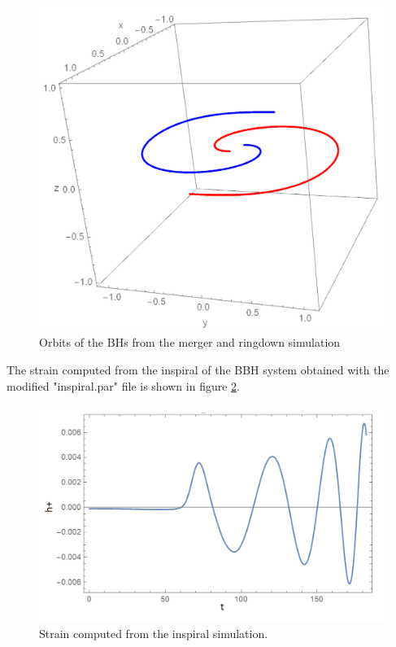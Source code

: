\documentclass[aps,twocolumn,secnumarabic,nobalancelastpage,amsmath,amssymb,
nofootinbib]{revtex4}
\begin{document}
   
    	\begin{figure}[h]
    		\includegraphics[width=\linewidth]{orbits.png}
    		\caption{Orbits of the BHs from the merger and ringdown simulation}
    		\label{orbits}
    	\end{figure}
  
        The strain computed from the inspiral of the BBH system obtained with the modified "inspiral.par" file is shown in figure \ref{inspiral}.
    	\begin{figure}[h]
    		\includegraphics[width=\linewidth]{inspiral.png}
    		\caption{Strain computed from the inspiral simulation.}
    		\label{inspiral}
    	\end{figure}
     
\end{document}
